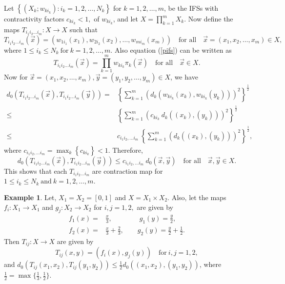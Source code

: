 \documentclass[10pt]{amsart}
\theoremstyle{definition}
\newtheorem{exm}{Example}[section]
\begin{document}
	Let $\left\{(X_k;w_{ki_k}):i_k=1,2,\ldots,N_k\right\}$ for $k=1,2,\ldots,m$, be the IFSs with contractivity factors $c_{ki_k}<1,$ of $w_{ki_k}$, and let $X=\prod_{k=1}^mX_k.$ Now define the maps $T_{i_1i_2\ldots i_m}:X\rightarrow X$ such that
	\begin{equation}
		T_{i_1i_2\ldots i_m}(\vec{x})=\left(w_{1i_1}(x_1),w_{2i_2}(x_2),\ldots,w_{mi_m}(x_m)\right) \quad \mbox{for all} \quad  \vec{x}=(x_1,x_2,\ldots,x_m)\in X,
		\label{pifs}
	\end{equation}
	where $1\leq i_k\leq N_k~\mbox{for}~k=1,2,\ldots,m.$
	Also equation (\ref{pifs}) can be written as
	\begin{equation}
		T_{i_1i_2\ldots i_m}(\vec{x})=\prod_{k=1}^mw_{ki_k}\pi_k(\vec{x})\quad \mbox{for all} \quad  \vec{x}\in X.
		\label{pho}
	\end{equation}
	Now for $\vec{x}=(x_1,x_2,\ldots,x_m), \vec{y}=(y_1,y_2,\ldots,y_m)\in X$, we have
	\begin{align*}
		d_0(T_{i_1i_2\ldots i_m}(\vec{x}),T_{i_1i_2\ldots i_m}(\vec{y}))=&\left\{\sum_{k=1}^{m}\left(d_k(w_{ki_k}(x_k),w_{ki_k}(y_k))\right)^2\right\}^\frac{1}{2}\\
		\leq&\left\{\sum_{k=1}^{m}\left(c_{ki_k}~d_k((x_k),(y_k))\right)^2\right\}^\frac{1}{2}\\
		\leq&c_{i_1i_2,\ldots i_m}~\left\{\sum_{k=1}^{m}\left(d_k((x_k),(y_k))\right)^2\right\}^\frac{1}{2},	
	\end{align*}
	where $c_{i_1i_2,\ldots i_m}=\max_{k}\left\{c_{ki_k}\right\}<1$. Therefore,
	\begin{equation}
		d_0(T_{i_1i_2\ldots i_m}(\vec{x}),T_{i_1i_2\ldots i_m}(\vec{y}))\leq c_{i_1i_2,\ldots i_m}~d_0(\vec{x},\vec{y})\quad \mbox{for all} \quad \vec{x},\vec{y}\in X.
	\end{equation}
	This shows that each $T_{i_1i_2\ldots i_m}$ are contraction map for $1\leq i_k\leq N_k~\mbox{and}~k=1,2,\ldots,m.$
	\begin{exm}
		Let, $X_1=X_2=[0,1]$ and $X=X_1\times X_2$. Also, let the maps $f_i:X_1\rightarrow X_1$ and $g_j:X_2\rightarrow X_2$ for $i,j=1,2,$ are given by
		\begin{align*}
			f_1(x)=&\frac{x}{3}, \quad\quad\quad\quad g_1(y)=\frac{y}{2}, \\
			f_2(x)=&\frac{x}{3}+\frac{2}{3},\quad\quad g_2(y)=\frac{y}{2}+\frac{1}{2}.	
		\end{align*}
		Then $T_{ij}:X\rightarrow X$ are given by
		$$T_{ij}(x,y)=(f_i(x),g_j(y))\quad \mbox{for}~i,j=1,2,$$
		and $d_0(T_{ij}(x_1,x_2),T_{ij}(y_1,y_2))\leq \frac{1}{2}d_0((x_1,x_2),(y_1,y_2))$, where $\frac{1}{2}=\max\{\frac{1}{3},\frac{1}{2}\}.$
		\label{expifs}
	\end{exm}
\end{document}
